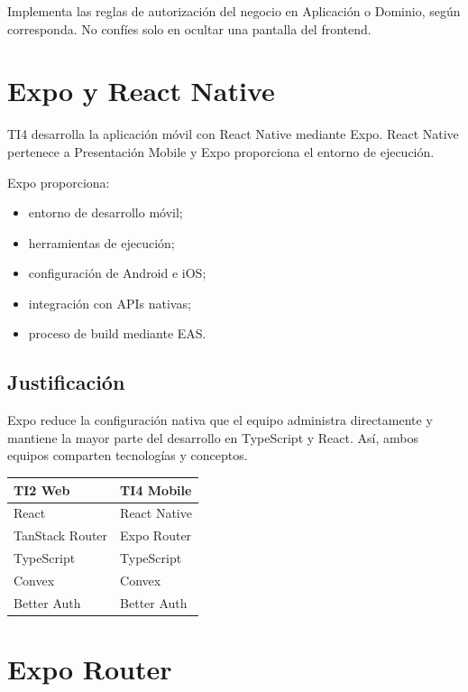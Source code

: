 \documentclass[11pt,a4paper]{article}
\begin{document}
Implementa las reglas de autorización del negocio en Aplicación o Dominio,
según corresponda. No confíes solo en ocultar una pantalla del frontend.

\section{Expo y React Native}

TI4 desarrolla la aplicación móvil con React Native mediante Expo. React Native
pertenece a Presentación Mobile y Expo proporciona el entorno de ejecución.

Expo proporciona:

\begin{itemize}
  \item entorno de desarrollo móvil;
  \item herramientas de ejecución;
  \item configuración de Android e iOS;
  \item integración con APIs nativas;
  \item proceso de build mediante EAS.
\end{itemize}

\subsection{Justificación}

Expo reduce la configuración nativa que el equipo administra directamente y
mantiene la mayor parte del desarrollo en TypeScript y React. Así, ambos
equipos comparten tecnologías y conceptos.

\begin{center}
  \begin{tabular}{ll}
    \toprule
    TI2 Web & TI4 Mobile \\
    \midrule
    React & React Native \\
    TanStack Router & Expo Router \\
    TypeScript & TypeScript \\
    Convex & Convex \\
    Better Auth & Better Auth \\
    \bottomrule
  \end{tabular}
\end{center}

\section{Expo Router}
\end{document}
